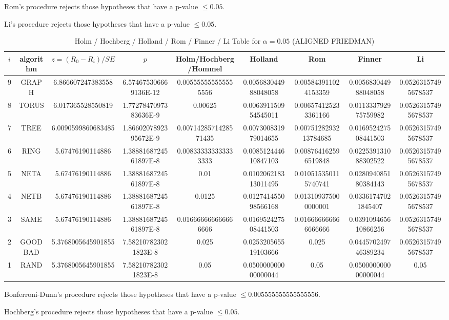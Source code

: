 \documentclass[a4paper,10pt]{article}
\begin{document}
\begin{landscape}
Rom's procedure rejects those hypotheses that have a p-value $\le0.05$.


Li's procedure rejects those hypotheses that have a p-value $\le0.05$.



\newpage

\begin{table}[!htp]
\centering\scriptsize
\caption{Holm / Hochberg / Holland / Rom / Finner / Li Table for $\alpha=0.05$ (ALIGNED FRIEDMAN)}
\begin{tabular}{ccccccccc}
$i$&algorithm&$z=(R_0 - R_i)/SE$&$p$&Holm/Hochberg/Hommel&Holland&Rom&Finner&Li\\
\hline
9& GRAPH&6.866607247383558&6.574675306669136E-12&0.005555555555555556&0.005683044988048058&0.005843911024153359&0.005683044988048058&0.05263157495678537\\
8& TORUS&6.017365528550819&1.7727847097383636E-9&0.00625&0.006391150954545011&0.006574125233361166&0.011333792975759982&0.05263157495678537\\
7& TREE&6.0090599860683485&1.8660207892395672E-9&0.0071428571428571435&0.007300831979014655&0.0075128293213784685&0.016952427508441503&0.05263157495678537\\
6& RING&5.67476190114886&1.3888168724561897E-8&0.008333333333333333&0.008512444610847103&0.008764162596519848&0.022539131088302522&0.05263157495678537\\
5& NETA&5.67476190114886&1.3888168724561897E-8&0.01&0.010206218313011495&0.010515350115740741&0.028094085180384143&0.05263157495678537\\
4& NETB&5.67476190114886&1.3888168724561897E-8&0.0125&0.012741455098566168&0.013109375000000001&0.03361747021845407&0.05263157495678537\\
3& SAME&5.67476190114886&1.3888168724561897E-8&0.016666666666666666&0.016952427508441503&0.016666666666666666&0.039109465610866256&0.05263157495678537\\
2& GOODBAD&5.3768005645901855&7.582107823021823E-8&0.025&0.025320565519103666&0.025&0.044570249746389234&0.05263157495678537\\
1& RAND&5.3768005645901855&7.582107823021823E-8&0.05&0.050000000000000044&0.05&0.050000000000000044&0.05\\
\hline
\end{tabular}
\end{table}
Bonferroni-Dunn's procedure rejects those hypotheses that have a p-value $\le0.005555555555555556$.


Hochberg's procedure rejects those hypotheses that have a p-value $\le0.05$.



\end{landscape}
\end{document}
